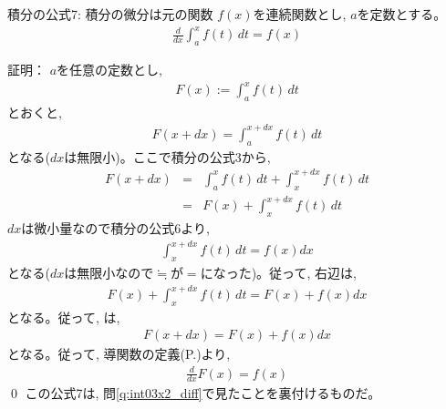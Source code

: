 \begin{itembox}{積分の公式7: 積分の微分は元の関数}
$f(x)$を連続関数とし, $a$を定数とする。
\begin{eqnarray}
\frac{d}{dx}\int_{a}^{x}f(t)\, dt=f(x)\label{eq:sekibun_koshiki7}
\end{eqnarray}
\end{itembox}
証明： $a$を任意の定数とし, 
\begin{eqnarray}F(x):=\int_{a}^{x}f(t)\, dt\end{eqnarray}
とおくと, 
\begin{eqnarray}F(x+dx)=\int_{a}^{x+dx}f(t)\, dt\end{eqnarray}
となる($dx$は無限小)。ここで積分の公式3から, 
\begin{eqnarray}
F(x+dx)&=&\int_{a}^{x}f(t)\, dt+\int_{x}^{x+dx}f(t)\, dt\nonumber\\
              &=&F(x)+\int_{x}^{x+dx}f(t)\, dt\label{eq:intform7-}
\end{eqnarray}
$dx$は微小量なので積分の公式6より, 
\begin{eqnarray}
\int_{x}^{x+dx}f(t)\, dt = f(x) dx
\end{eqnarray}
となる($dx$は無限小なので$\fallingdotseq$が$=$になった)。従って, 右辺は, 
\begin{eqnarray*}
F(x)+\int_{x}^{x+dx}f(t)\, dt = F(x)+ f(x)dx
\end{eqnarray*}
となる。従って, は,
\begin{eqnarray}
F(x+dx)= F(x)+ f(x) dx
\end{eqnarray}
となる。従って, 導関数の定義(P.\pageref{eq:define_dif})より, 
\begin{eqnarray*}
\frac{d}{dx}F(x)=f(x)
\end{eqnarray*}
\qed
この公式7は, 問\ref{q:int03x2_diff}で見たことを裏付けるものだ。\\

